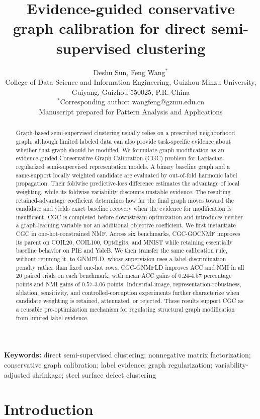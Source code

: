 \documentclass[11pt]{article}
\title{Evidence-guided conservative graph calibration for direct semi-supervised clustering}
\author{Deshu Sun, Feng Wang$^{*}$\\
\small College of Data Science and Information Engineering, Guizhou Minzu University, Guiyang, Guizhou 550025, P.R. China\\
\small $^{*}$Corresponding author: wangfeng@gzmu.edu.cn\\
\small Manuscript prepared for Pattern Analysis and Applications}
\date{}
\makeatletter
\theoremstyle{remark}
\newcommand{\frontblock}[1]{#1}
\newcommand{\frontblock}[1]{\twocolumn[\begin{@twocolumnfalse}#1\end{@twocolumnfalse}]}
\makeatother
\begin{document}
\frontblock{
\maketitle
\begin{abstract}
Graph-based semi-supervised clustering usually relies on a prescribed neighborhood graph, although limited labeled data can also provide task-specific evidence about whether that graph should be modified. We formulate graph modification as an evidence-guided Conservative Graph Calibration (CGC) problem for Laplacian-regularized semi-supervised representation models. A binary baseline graph and a same-support locally weighted candidate are evaluated by out-of-fold harmonic label propagation. Their foldwise predictive-loss difference estimates the advantage of local weighting, while its foldwise variability discounts unstable evidence. The resulting retained-advantage coefficient determines how far the final graph moves toward the candidate and yields exact baseline recovery when the evidence for modification is insufficient. CGC is completed before downstream optimization and introduces neither a graph-learning variable nor an additional objective coefficient. We first instantiate CGC in one-hot-constrained NMF. Across six benchmarks, CGC-GOCNMF improves its parent on COIL20, COIL100, Optdigits, and MNIST while retaining essentially baseline behavior on PIE and YaleB. We then transfer the same calibration rule, without retuning it, to GNMFLD, whose supervision uses a label-discrimination penalty rather than fixed one-hot rows. CGC-GNMFLD improves ACC and NMI in all 20 paired trials on each benchmark, with mean ACC gains of $0.24$-$4.57$ percentage points and NMI gains of $0.57$-$3.06$ points. Industrial-image, representation-robustness, ablation, sensitivity, and controlled-corruption experiments further characterize when candidate weighting is retained, attenuated, or rejected. These results support CGC as a reusable pre-optimization mechanism for regulating structural graph modification from limited label evidence.
\end{abstract}
\vspace{1mm}\noindent\textbf{Keywords:} direct semi-supervised clustering; nonnegative matrix factorization; conservative graph calibration; label evidence; graph regularization; variability-adjusted shrinkage; steel surface defect clustering
\vspace{5mm}
}

\section{Introduction}
\label{sec:introduction}
\end{document}

